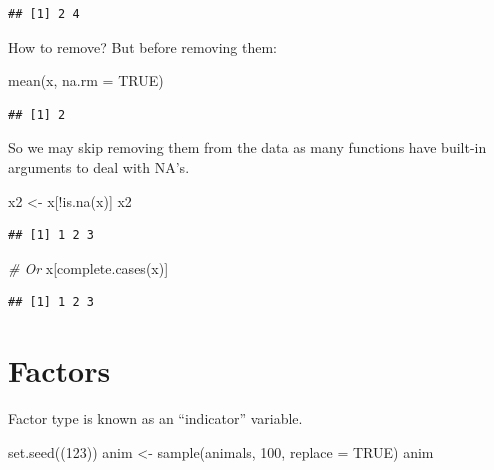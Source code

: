 \documentclass[
]{book}
\newenvironment{Shaded}{\begin{snugshade}}{\end{snugshade}}
\newcommand{\AttributeTok}[1]{\textcolor[rgb]{0.77,0.63,0.00}{#1}}
\newcommand{\CommentTok}[1]{\textcolor[rgb]{0.56,0.35,0.01}{\textit{#1}}}
\newcommand{\ConstantTok}[1]{\textcolor[rgb]{0.00,0.00,0.00}{#1}}
\newcommand{\DecValTok}[1]{\textcolor[rgb]{0.00,0.00,0.81}{#1}}
\newcommand{\FunctionTok}[1]{\textcolor[rgb]{0.00,0.00,0.00}{#1}}
\newcommand{\NormalTok}[1]{#1}
\newcommand{\OtherTok}[1]{\textcolor[rgb]{0.56,0.35,0.01}{#1}}
\newcommand{\SpecialCharTok}[1]{\textcolor[rgb]{0.00,0.00,0.00}{#1}}
\theoremstyle{definition}
\theoremstyle{definition}
\theoremstyle{definition}
\theoremstyle{definition}
\theoremstyle{remark}
\begin{document}
\begin{verbatim}
## [1] 2 4
\end{verbatim}

How to remove? But before removing them:

\begin{Shaded}
\begin{Highlighting}[]
\FunctionTok{mean}\NormalTok{(x, }\AttributeTok{na.rm =} \ConstantTok{TRUE}\NormalTok{)}
\end{Highlighting}
\end{Shaded}

\begin{verbatim}
## [1] 2
\end{verbatim}

So we may skip removing them from the data as many functions have built-in arguments to deal with NA's.

\begin{Shaded}
\begin{Highlighting}[]
\NormalTok{x2 }\OtherTok{\textless{}{-}}\NormalTok{ x[}\SpecialCharTok{!}\FunctionTok{is.na}\NormalTok{(x)]}
\NormalTok{x2}
\end{Highlighting}
\end{Shaded}

\begin{verbatim}
## [1] 1 2 3
\end{verbatim}

\begin{Shaded}
\begin{Highlighting}[]
\CommentTok{\# Or}
\NormalTok{x[}\FunctionTok{complete.cases}\NormalTok{(x)]}
\end{Highlighting}
\end{Shaded}

\begin{verbatim}
## [1] 1 2 3
\end{verbatim}

\hypertarget{factors}{%
\section{Factors}\label{factors}}

Factor type is known as an ``indicator'' variable.

\begin{Shaded}
\begin{Highlighting}[]
\FunctionTok{set.seed}\NormalTok{((}\DecValTok{123}\NormalTok{))}
\NormalTok{anim }\OtherTok{\textless{}{-}} \FunctionTok{sample}\NormalTok{(animals, }\DecValTok{100}\NormalTok{, }\AttributeTok{replace =} \ConstantTok{TRUE}\NormalTok{)}
\NormalTok{anim}
\end{Highlighting}
\end{Shaded}
\end{document}
